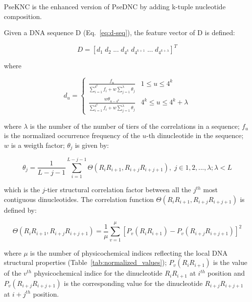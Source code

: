 
\gls{PseKNC} is the enhanced version of \gls{PseDNC} by adding k-tuple nucleotide composition.

Given a \gls{DNA} sequence D (Eq.~\ref{eq:d-seq}), the feature vector of D is defined:

\begin{equation}\label{eq:PseKNC-feature-vector}
    D = [d_{1}\;d_{2}\;...\;d_{4^{k}}\;d_{4^{k+1}}\;...\;d_{4^{k+ \lambda}}]^{T}
\end{equation}

where

\begin{equation}\label{eq:PseKNC-du}
    d_{u} = 
    \begin{cases}
        \frac{f_{u}}{\sum_{i=1}^{4^{k}} f_{i} + w\sum_{j=1}^{\lambda}\theta_{j}} & 1 \le u \le 4^{k}
    \\
        \frac{w\theta_{u-4^{k}}}{\sum_{i=1}^{4^{k}} f_{i} + w\sum_{j=1}^{\lambda}\theta_{j}} & 4^{k} \le u \le 4^{k} + \lambda
    
    \end{cases}
\end{equation}

where $\lambda$ is the number of the number of tiers of the correlations in a sequence; $f_{u}$ is the normalized occurrence frequency of the $u$-th dinucleotide in the sequence; $w$ is a weigth factor; $\theta_{j}$ is given by:

\begin{equation}\label{eq:PseKNC-thetas}
\theta_{j} = \frac{1}{L-j-1} \sum_{i=1}^{L-j-1}\Theta(R_{i}R_{i+1}, R_{i+j}R_{i+j+1}), \;j\in{1,2,...,\lambda;\lambda < L}
\end{equation}

which is the $j$-tier structural correlation factor between all the $j^{th}$ most
contiguous dinucleotides. The correlation function $\Theta(R_{i}R_{i+1}, R_{i+j}R_{i+j+1})$ is defined by:

\begin{equation}\label{eq:PseKNC-correlation}
    \Theta(R_{i}R_{i+1}, R_{i+j}R_{i+j+1}) = \frac{1}{\mu}\sum_{v=1}^{\mu}[P_{v} (R_{i}R_{i+1}) - P_{v}(R_{i+j}R_{i+j+1})]^{2}
\end{equation}

where $\mu$ is the number of physicochemical indices reflecting the local \gls{DNA} structural properties (Table~\ref{tab:normalized_values}); $P_{v} (R_{i}R_{i+1})$ is the value of the $v^{th}$ physicochemical indice for the dinucleotide $R_{i}R_{i+1}$ at $i^{th}$ position and $P_{v} (R_{i+j}R_{i+j+1})$ is the corresponding value for the dinucleotide $R_{i+j}R_{i+j+1}$ at $i+j^{th}$ position.


